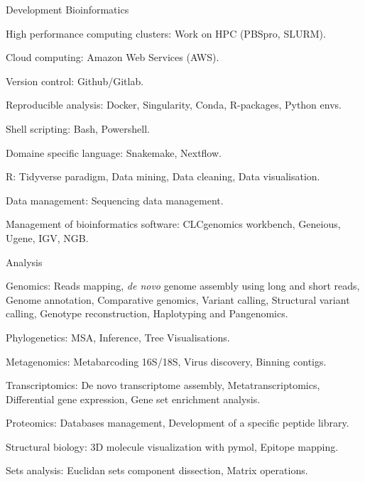 \begin{cventries}
  \cventry
    {Development} %
    {Bioinformatics} %
    {} %
    {} %
    {
      \begin{cvitems} %
        \item {High performance computing clusters: Work on HPC (PBSpro, SLURM).}
        \item {Cloud computing: Amazon Web Services (AWS).}
        \item {Version control: Github/Gitlab.}
        \item {Reproducible analysis: Docker, Singularity, Conda, R-packages, Python envs.}
        \item {Shell scripting: Bash, Powershell.}
        \item {Domaine specific language: Snakemake, Nextflow.}
        \item {R: Tidyverse paradigm, Data mining, Data cleaning, Data visualisation.}
        \item {Data management: Sequencing data management.}
        \item {Management of bioinformatics software: CLCgenomics workbench, Geneious, Ugene, IGV, NGB.}
      \end{cvitems}
    }

  \cventry
    {Analysis} %
    {} %
    {} %
    {} %
    {
      \begin{cvitems} %
        \item {Genomics: Reads mapping, \textit{de novo} genome assembly using long and short reads, Genome annotation, Comparative genomics, Variant calling, Structural variant calling, Genotype reconstruction, Haplotyping and Pangenomics.}
        \item {Phylogenetics: MSA, Inference, Tree Visualisations.}
        \item {Metagenomics: Metabarcoding 16S/18S, Virus discovery, Binning contigs.}
        \item {Transcriptomics: De novo transcriptome assembly, Metatranscriptomics, Differential gene expression, Gene set enrichment analysis.}
        \item {Proteomics: Databases management, Development of a specific peptide library.}
        \item {Structural biology: 3D molecule visualization with pymol, Epitope mapping.}
        \item {Sets analysis: Euclidan sets component dissection, Matrix operations.}
      \end{cvitems}
    }


\end{cventries}